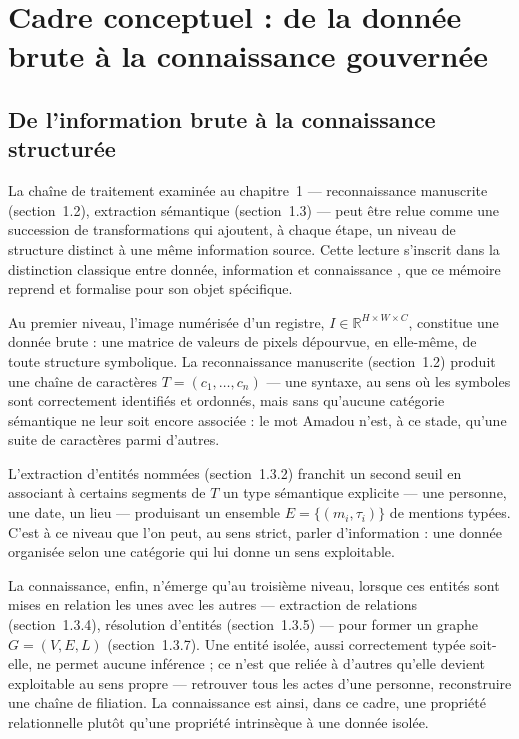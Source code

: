 \section{Cadre conceptuel : de la donnée brute à la connaissance gouvernée}

\subsection{De l'information brute à la connaissance structurée}

La chaîne de traitement examinée au chapitre~1 --- reconnaissance manuscrite (section~1.2), extraction sémantique (section~1.3) --- peut être relue comme une succession de transformations qui ajoutent, à chaque étape, un niveau de structure distinct à une même information source. Cette lecture s'inscrit dans la distinction classique entre donnée, information et connaissance \cite{ackoff1989data}, que ce mémoire reprend et formalise pour son objet spécifique.

Au premier niveau, l'image numérisée d'un registre, $I \in \mathbb{R}^{H \times W \times C}$, constitue une donnée brute : une matrice de valeurs de pixels dépourvue, en elle-même, de toute structure symbolique.
La reconnaissance manuscrite (section~1.2) produit une chaîne de caractères $T = (c_1, \dots, c_n)$ --- une syntaxe, au sens où les symboles sont correctement identifiés et ordonnés, mais sans qu'aucune catégorie sémantique ne leur soit encore associée : le mot \og Amadou \fg{} n'est, à ce stade, qu'une suite de caractères parmi d'autres.

L'extraction d'entités nommées (section~1.3.2) franchit un second seuil en associant à certains segments de $T$ un type sémantique explicite --- une personne, une date, un lieu --- produisant un ensemble $E = \{(m_i, \tau_i)\}$ de mentions typées.
C'est à ce niveau que l'on peut, au sens strict, parler d'information : une donnée organisée selon une catégorie qui lui donne un sens exploitable.

La connaissance, enfin, n'émerge qu'au troisième niveau, lorsque ces entités sont mises en relation les unes avec les autres --- extraction de relations (section~1.3.4), résolution d'entités (section~1.3.5) --- pour former un graphe $G = (V, E, L)$ (section~1.3.7).
Une entité isolée, aussi correctement typée soit-elle, ne permet aucune inférence ; ce n'est que reliée à d'autres qu'elle devient exploitable au sens propre --- retrouver tous les actes d'une personne, reconstruire une chaîne de filiation.
La connaissance est ainsi, dans ce cadre, une propriété relationnelle plutôt qu'une propriété intrinsèque à une donnée isolée.

